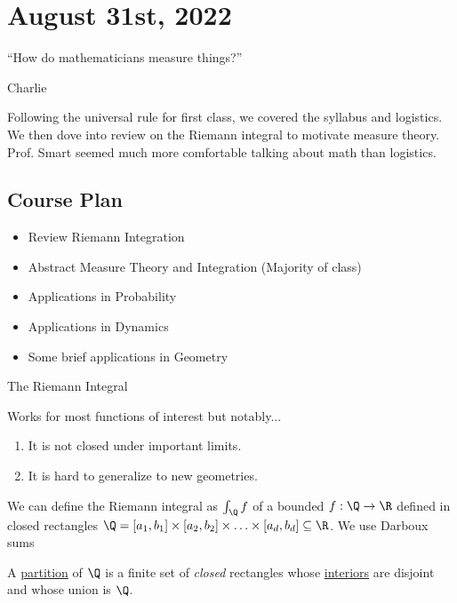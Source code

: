 \section{August 31st, 2022}

\epigraph{``How do mathematicians measure things?''}{Charlie}

Following the universal rule for first class, we covered the syllabus and logistics. We then dove into review on the Riemann integral to motivate measure theory. Prof. Smart seemed much more comfortable talking about math than logistics.

\subsection{Course Plan}
\begin{itemize}
	\item Review Riemann Integration
	\item Abstract Measure Theory and Integration (Majority of class)
	\item Applications in Probability
	\item Applications in Dynamics
	\item Some brief applications in Geometry
\end{itemize}

\begin{problem} The Riemann Integral
\item Works for most functions of interest but notably...
	\begin{enumerate}
		\item It is not closed under important limits.
		\item It is hard to generalize to new geometries.
	\end{enumerate}
\end{problem}

\begin{definition}
	We can define the Riemann integral as $\int_{{\Q}}^{{}} {f}$ of a bounded $f : \Q \to \R$
	defined in closed rectangles
	$\Q = [a_1,b_1] \times [a_2,b_2] \times \ldots \times [a_d,b_d] \subseteq \R$. We use Darboux sums
\end{definition}

\vline
\begin{definition}[Partition]
	A \underline{partition} of $\Q$	is a finite set of \emph{closed} rectangles whose \underline{interiors} are disjoint and whose union is $\Q$.
\end{definition}

